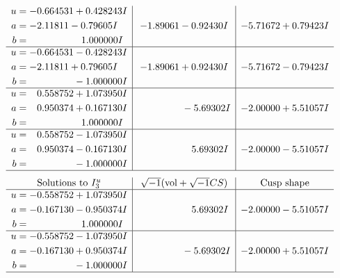 \documentclass[1p]{elsarticle_modified}
\theoremstyle{definition}
\newcommand{\I}{\sqrt{-1}}
\begin{document}
$$\begin{array}{c|c|c}
\begin{aligned}
u &= -0.664531 + 0.428243 I \\
a &= -2.11811 - 0.79605 I \\
b &= \phantom{-0.000000 -}1.000000 I\end{aligned}
 & -1.89061 - 0.92430 I & -5.71672 + 0.79423 I \\ \hline\begin{aligned}
u &= -0.664531 - 0.428243 I \\
a &= -2.11811 + 0.79605 I \\
b &= \phantom{-0.000000 } -1.000000 I\end{aligned}
 & -1.89061 + 0.92430 I & -5.71672 - 0.79423 I \\ \hline\begin{aligned}
u &= \phantom{-}0.558752 + 1.073950 I \\
a &= \phantom{-}0.950374 + 0.167130 I \\
b &= \phantom{-0.000000 -}1.000000 I\end{aligned}
 & \phantom{-0.000000 } -5.69302 I & -2.00000 + 5.51057 I \\ \hline\begin{aligned}
u &= \phantom{-}0.558752 - 1.073950 I \\
a &= \phantom{-}0.950374 - 0.167130 I \\
b &= \phantom{-0.000000 } -1.000000 I\end{aligned}
 & \phantom{-0.000000 -}5.69302 I & -2.00000 - 5.51057 I\\
 \hline 
 \end{array}$$\newpage$$\begin{array}{c|c|c}  
\text{Solutions to }I^u_{3}& \I (\text{vol} + \sqrt{-1}CS) & \text{Cusp shape}\\
 \hline 
\begin{aligned}
u &= -0.558752 + 1.073950 I \\
a &= -0.167130 - 0.950374 I \\
b &= \phantom{-0.000000 -}1.000000 I\end{aligned}
 & \phantom{-0.000000 -}5.69302 I & -2.00000 - 5.51057 I \\ \hline\begin{aligned}
u &= -0.558752 - 1.073950 I \\
a &= -0.167130 + 0.950374 I \\
b &= \phantom{-0.000000 } -1.000000 I\end{aligned}
 & \phantom{-0.000000 } -5.69302 I & -2.00000 + 5.51057 I\\
 \hline 
 \end{array}$$\newpage\newpage\renewcommand{\arraystretch}{1}
\end{document}
